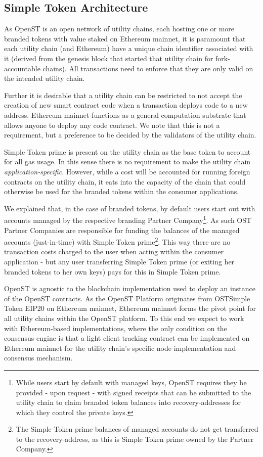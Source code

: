\documentclass[12pt,a4paper, twocolumn]{article}
\begin{document}
\subsection{Simple Token Architecture}
As OpenST is an open network of utility chains, each hosting one or more branded tokens with value staked on Ethereum mainnet, it is paramount that each utility chain (and Ethereum) have a unique chain identifier associated with it (derived from the genesis block that started that utility chain for fork-accountable chains).  All transactions need to enforce that they are only valid on the intended utility chain. \par
Further it is desirable that a utility chain can be restricted to not accept the creation of new smart contract code when a transaction deploys code to a new address.  Ethereum mainnet functions as a general computation substrate that allows anyone to deploy any code contract.  We note that this is not a requirement, but a preference to be decided by the validators of the utility chain. \par
Simple Token prime is present on the utility chain as the base token to account for all gas usage.  In this sense there is no requirement to make the utility chain \textit{application-specific}.  However, while a cost will be accounted for running foreign contracts on the utility chain, it eats into the capacity of the chain that could otherwise be used for the branded tokens within the consumer applications. \par
We explained that, in the case of branded tokens, by default users start out with accounts managed by the respective branding Partner Company\footnote{While users start by default with managed keys, OpenST requires they be provided - upon request - with signed receipts that can be submitted to the utility chain to claim branded token balances into recovery-addresses for which they control the private keys.}. As such OST Partner Companies are responsible for funding the balances of the managed accounts (just-in-time) with Simple Token prime\footnote{The Simple Token prime balances of managed accounts do not get transferred to the recovery-address, as this is Simple Token prime owned by the Partner Company.}. This way there are no transaction costs charged to the user when acting within the consumer application - but any user transferring Simple Token prime (or exiting her branded tokens to her own keys) pays for this in Simple Token prime. \par
OpenST is agnostic to the blockchain implementation used to deploy an instance of the OpenST contracts.  As the OpenST Platform originates from OSTSimple Token EIP20 on Ethereum mainnet, Ethereum mainnet forms the pivot point for all utility chains within the OpenST platform.  To this end we expect to work with Ethereum-based implementations, where the only condition on the consensus engine is that a light client tracking contract can be implemented on Ethereum mainnet for the utility chain’s specific node implementation and consensus mechanism.\par
\end{document}
